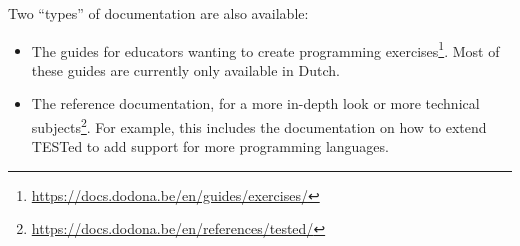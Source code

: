 \documentclass[./main]{subfiles}
\begin{document}
Two ``types'' of documentation are also available:

\begin{itemize}
    \item The guides for educators wanting to create programming exercises\footnote{\url{https://docs.dodona.be/en/guides/exercises/}}.
          Most of these guides are currently only available in Dutch.
    \item The reference documentation, for a more in-depth look or more technical subjects\footnote{\url{https://docs.dodona.be/en/references/tested/}}.
          For example, this includes the documentation on how to extend TESTed to add support for more programming languages.
\end{itemize}
\end{document}
